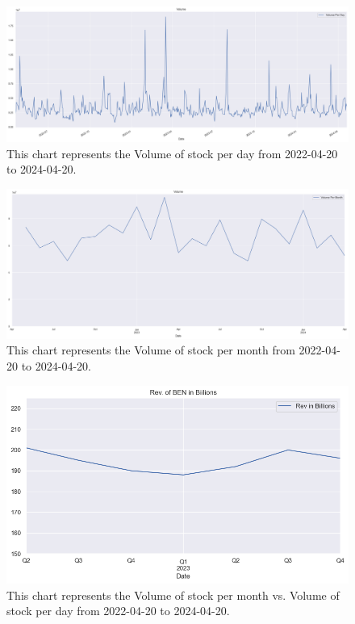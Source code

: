 \documentclass[9pt,a4paper,twoside]{tau}
\begin{document}
            \begin{figure}[H]
                \centering
                \includegraphics[width=0.85\columnwidth]{images/VolumeDataSet1d.png}
                \caption{This chart represents the Volume of stock per day from 2022-04-20 to 2024-04-20.}
                \label{fig:figure}
            \end{figure}

            \begin{figure}[H]
                \centering
                \includegraphics[width=0.85\columnwidth]{images/VolumeDataSet1mo.png}
                \caption{This chart represents the Volume of stock per month from 2022-04-20 to 2024-04-20.}
                \label{fig:figure}
            \end{figure}

            \begin{figure}[H]
                \centering
                \includegraphics[width=0.85\columnwidth]{images/RevInBillions.png}
                \caption{This chart represents the Volume of stock per month vs. Volume of stock per day from 2022-04-20 to 2024-04-20.}
                \label{fig:figure}
            \end{figure}
            
\end{document}
